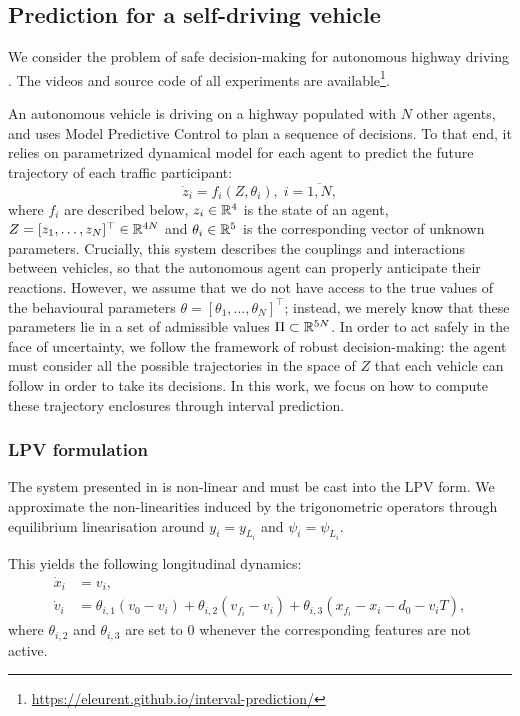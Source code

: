 \subsection{Prediction for a self-driving vehicle}
\label{sec:Examples}
We consider the problem of safe decision-making for autonomous highway driving \citep{highway-env}. The videos and source code of all experiments are available\footnote{\href{https://eleurent.github.io/interval-prediction/}{https://eleurent.github.io/interval-prediction/}}.

An autonomous vehicle is driving on a highway populated with $N$ other agents, and uses Model Predictive Control to plan a sequence of decisions. To that end, it relies on parametrized dynamical model for each agent to predict the future trajectory of each traffic participant: $$\dot{z}_i=f_i(Z,\theta_i),\;i=\overline{1,N},$$ where $f_i$ are described below, $z_i\in\mathbb{R}^4$ is the state of an agent, $Z = [z_1,\dots,z_N]^\top\in\mathbb{R}^{4N}$ and $\theta_i\in\mathbb{R}^5$ is the corresponding vector of unknown parameters. Crucially, this system describes the couplings and interactions between vehicles, so that the autonomous agent can properly anticipate their reactions. 
However, we assume that we do not have access to the true values of the behavioural parameters $\theta=[\theta_1,\dots,\theta_N]^\top$; instead, we merely know that these parameters lie in a set of admissible values $\Pi\subset\mathbb{R}^{5N}$. In order to act safely in the face of uncertainty, we follow the framework of robust decision-making: the agent must consider all the possible trajectories in the space of $Z$ that each vehicle can follow in order to take its decisions. In this work, we focus on how to compute these trajectory enclosures through interval prediction.

\subsubsection{LPV formulation}

The system presented in  is non-linear and must be cast into the LPV form. We approximate the non-linearities induced by the trigonometric operators through equilibrium linearisation around $y_i=y_{L_i}$ and $\psi_i=\psi_{L_i}$.

This yields the following longitudinal dynamics:
\begin{align*}
\dot{x}_i &= v_i,\\
\dot v_i &= \theta_{i,1} (v_0 - v_i) + \theta_{i,2} (v_{f_i} - v_i) + \theta_{i,3}(x_{f_i} - x_i - d_0 - v_i T),
\end{align*}
where $\theta_{i,2}$ and $\theta_{i,3}$ are set to $0$ whenever the corresponding features are not active.

